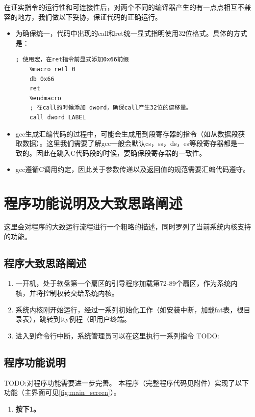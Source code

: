 \documentclass[forprint]{WHUBachelor}
\begin{document}
在证实指令的运行性和可连接性后，对两个不同的编译器产生的有一点点相互不兼容的地方，我们做以下妥协，保证代码的正确运行。

\begin{itemize}
  \item 为确保统一，代码中出现的call和ret统一显式指明使用32位格式。具体的方式是：
  \begin{lstlisting}[language={[x86masm]Assembler}]
    ; 使用宏，在ret指令前显式添加0x66前缀
    %macro retl 0
    db 0x66
    ret
    %endmacro
    ; 在call的时候添加 dword，确保call产生32位的偏移量。
    call dword LABEL
  \end{lstlisting}

  \item gcc生成汇编代码的过程中，可能会生成用到段寄存器的指令（如从数据段获取数据）。这里我们需要了解gcc一般会默认cs，ss，ds，es等段寄存器都是一致的。因此在跳入C代码段的时候，要确保段寄存器的一致性。

  \item gcc遵循C调用约定，因此关于参数传递以及返回值的规范需要汇编代码遵守。
  
\end{itemize}

\section{程序功能说明及大致思路阐述}

这里会对程序的大致运行流程进行一个粗略的描述，同时罗列了当前系统内核支持的功能。

\subsection{程序大致思路阐述}

\begin{enumerate}
  \item 一开机，处于软盘第一个扇区的引导程序加载第72-89个扇区，作为系统内核，并将控制权转交给系统内核。
  \item 系统内核刚开始运行，经过一系列初始化工作（如安装中断，加载fat表，根目录表），跳转到tty例程（即用户终端。
  \item 进入到命令行中断，系统管理员可以在这里执行一系列指令 TODO:
\end{enumerate}

\subsection{程序功能说明}
TODO:对程序功能需要进一步完善。
本程序（完整程序代码见附件）实现了以下功能（主界面可见\autoref{fig:main_screen}）。
\begin{enumerate}
  \item \textbf{按下1。}
\end{enumerate}
\end{document}
